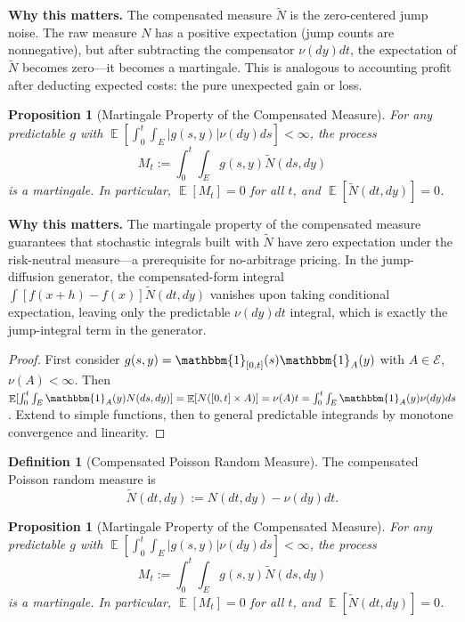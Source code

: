 \documentclass[11pt,a4paper,openany]{book}
\theoremstyle{definition}
\newtheorem{definition}{Definition}[chapter]
\theoremstyle{plain}
\newtheorem{proposition}[theorem]{Proposition}
\theoremstyle{remark}
\DeclareMathOperator{\E}{\mathbb{E}}
\newcommand{\1}{\mathbbm{1}}
\newcommand{\calE}{\mathcal{E}}
\begin{document}
\medskip
\noindent\textbf{Why this matters.} The compensated measure $\widetilde{N}$ is the zero-centered jump noise. The raw measure $N$ has a positive expectation (jump counts are nonnegative), but after subtracting the compensator $\nu(dy)dt$, the expectation of $\widetilde{N}$ becomes zero---it becomes a martingale. This is analogous to accounting profit after deducting expected costs: the pure unexpected gain or loss.

\begin{proposition}[Martingale Property of the Compensated Measure]
For any predictable $g$ with $\E[\int_{0}^{t} \int_{E} |g(s,y)| \nu(dy) ds] < \infty$, the process
\[
M_{t} := \int_{0}^{t} \int_{E} g(s, y) \widetilde{N}(ds, dy)
\]
is a martingale. In particular, $\E[M_{t}] = 0$ for all $t$, and $\E[\widetilde{N}(dt, dy)] = 0$.
\end{proposition}

\medskip
\noindent\textbf{Why this matters.} The martingale property of the compensated measure guarantees that stochastic integrals built with $\widetilde{N}$ have zero expectation under the risk-neutral measure---a prerequisite for no-arbitrage pricing. In the jump-diffusion generator, the compensated-form integral $\int [f(x+h) - f(x)] \widetilde{N}(dt,dy)$ vanishes upon taking conditional expectation, leaving only the predictable $\nu(dy)dt$ integral, which is exactly the jump-integral term in the generator.

\begin{proof}
First consider $g(s, y) = \1_{[0,t]}(s) \1_{A}(y)$ with $A \in \calE$, $\nu(A) < \infty$. Then $\E[\int_{0}^{t} \int_{E} \1_{A}(y) N(ds, dy)] = \E[N([0,t] \times A)] = \nu(A) t = \int_{0}^{t} \int_{E} \1_{A}(y) \nu(dy) ds$. Extend to simple functions, then to general predictable integrands by monotone convergence and linearity.
\end{proof}

\begin{definition}[Compensated Poisson Random Measure]
The compensated Poisson random measure is
\[
\widetilde{N}(dt, dy) := N(dt, dy) - \nu(dy) dt.
\]
\end{definition}

\begin{proposition}[Martingale Property of the Compensated Measure]
For any predictable $g$ with $\E[\int_{0}^{t} \int_{E} |g(s,y)| \nu(dy) ds] < \infty$, the process
\[
M_{t} := \int_{0}^{t} \int_{E} g(s, y) \widetilde{N}(ds, dy)
\]
is a martingale. In particular, $\E[M_{t}] = 0$ for all $t$, and $\E[\widetilde{N}(dt, dy)] = 0$.
\end{proposition}
\end{document}
